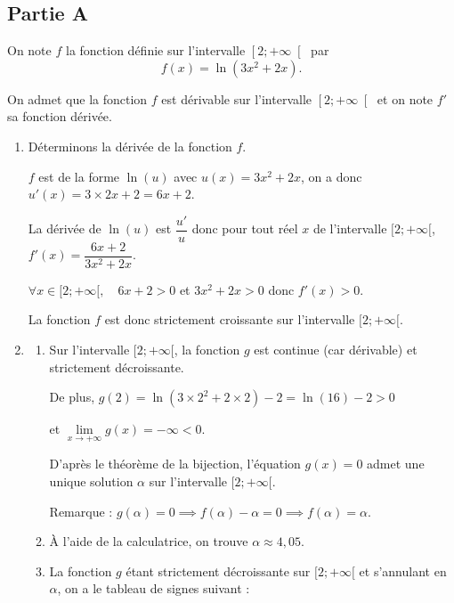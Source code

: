 \subsection*{Partie A}
On note $f$ la fonction définie sur l'intervalle $\left[2 ;+\infty\right[$ par \[f(x)=\ln \left(3 x^{2}+2 x\right).\]

On admet que la fonction $f$ est dérivable sur l'intervalle $\left[2 ; +\infty \right[$ et on note $f'$ sa fonction dérivée.

\begin{enumerate}
	\item Déterminons la dérivée de la fonction $f$.

	$f$ est de la forme $\ln( u)$ avec $u(x) =3 x^{2}+2 x$, on a donc $u'(x)=3\times 2x+2=6x+2$.

	La dérivée de $\ln(u)$ est $\dfrac{u'}{u}$ donc pour tout réel $x$ de l'intervalle $[2 ;+\infty[$, $f'(x) = \dfrac{6x+2}{3 x^{2}+2 x}$.

	$\forall x \in [2 ;+\infty[,  \quad 6x+2 >0$ et $3x^2+2x >0$ donc $f'(x) >0$.

	La fonction $f$ est donc strictement croissante sur l'intervalle $[2 ;+\infty[$.

	\item
	\begin{enumerate}
		\item  Sur l'intervalle $[2;+\infty[$, la fonction $g$ est continue (car dérivable) et strictement décroissante.

		De plus, $g(2) = \ln( 3\times 2^2+2 \times 2)-2 = \ln(16)-2 >0$

		et $\lim\limits_{x \to +\infty} g(x) =- \infty <0$.

		D'après le théorème de la bijection, l'équation $g(x) =0$ admet une unique solution  $\alpha$  sur l'intervalle $[2;+\infty[$.

		Remarque : $g(\alpha) =0 \implies f(\alpha)-\alpha =0 \implies f(\alpha)=\alpha$.

		\item  À l'aide de la calculatrice, on trouve $\alpha \approx 4,05$.

		\item  La fonction $g$ étant strictement décroissante sur $[2 ;+\infty[$ et s'annulant en $\alpha$, on a le tableau de signes suivant :

		\hfill~
		\hfill~



	\end{enumerate}
\end{enumerate}

